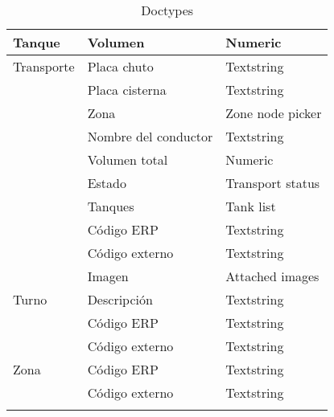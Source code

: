 \begin{longtable}{ | p{5em} | l | l | }
    Tanque
        & Volumen & Numeric \\
    \hline

    Transporte
        & Placa chuto & Textstring \\
        \cline{2-3}
        & Placa cisterna & Textstring \\
        \cline{2-3}
        & Zona & Zone node picker \\
        \cline{2-3}
        & Nombre del conductor & Textstring \\
        \cline{2-3}
        & Volumen total & Numeric \\
        \cline{2-3}
        & Estado & Transport status \\
        \cline{2-3}
        & Tanques & Tank list \\
        \cline{2-3}
        & Código ERP & Textstring \\
        \cline{2-3}
        & Código externo & Textstring \\
        \cline{2-3}
        & Imagen & Attached images \\
    \hline

    Turno
        & Descripción & Textstring \\
        \cline{2-3}
        & Código ERP & Textstring \\
        \cline{2-3}
        & Código externo & Textstring \\
    \hline

    Zona
        & Código ERP & Textstring \\
        \cline{2-3}
        & Código externo & Textstring \\
    \hline

    \caption{Doctypes}
    \label{table:doctypes}
\end{longtable}
